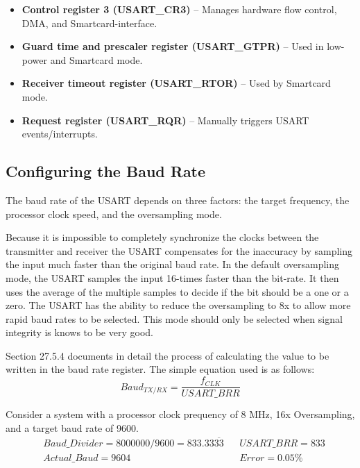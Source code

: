 \documentclass[11pt,fleqn]{book} %
\begin{document}
\begin{itemize}
    \item \textbf{Control register 3 (USART\_CR3)} -- Manages hardware flow control, DMA, and Smartcard-interface. 
    \item \textbf{Guard time and prescaler register (USART\_GTPR)} -- Used in low-power and Smartcard mode. 
    \item \textbf{Receiver timeout register (USART\_RTOR)} -- Used by Smartcard mode. 
    \item \textbf{Request register (USART\_RQR)} -- Manually triggers USART events/interrupts. 
\end{itemize}

\subsection{Configuring the Baud Rate}	
The baud rate of the USART depends on three factors: the target frequency, the processor clock speed, and the oversampling mode.

Because it is impossible to completely synchronize the clocks between the transmitter and receiver the USART compensates for the inaccuracy by sampling the input much faster than the original baud rate. In the default oversampling mode, the USART samples the input 16-times faster than the bit-rate. It then uses the average of the multiple samples to decide if the bit should be a one or a zero. The USART has the ability to reduce the oversampling to 8x to allow more rapid baud rates to be selected. This mode should only be selected when signal integrity is knows to be very good.

Section 27.5.4 documents in detail the process of calculating the value to be written in the baud rate register. The simple equation used is as follows:
\begin{equation*}
Baud_{TX/RX} = \frac{f_{CLK}}{USART\_BRR}
\end{equation*}



\begin{example}
    Consider a system with a processor clock prequency of 8 MHz, 16x Oversampling, and a target baud rate of 9600.  
    \begin{align*}
    & Baud\_Divider = 8000000/9600 = 833.33\overline{33} & & USART\_BRR = 833\\[0.25em]
    & Actual\_Baud = 9604 & & Error = 0.05 \%
    \end{align*}
    
\end{example}
    
\end{document}
